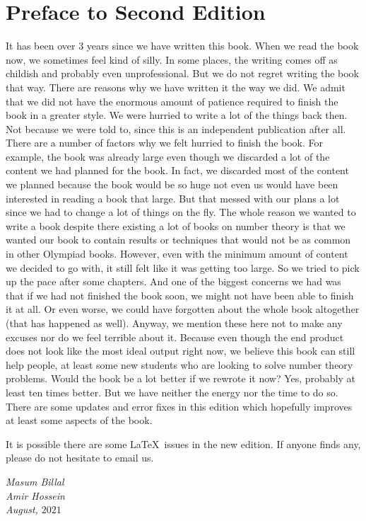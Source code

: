 \documentclass[leqno,11pt]{book}
\begin{document}
\section*{Preface to Second Edition}
It has been over $3$ years since we have written this book. When we read the book now, we sometimes feel kind of silly. In some places, the writing comes off as childish and probably even unprofessional. But we do not regret writing the book that way. There are reasons why we have written it the way we did. We admit that we did not have the enormous amount of patience required to finish the book in a greater style. We were hurried to write a lot of the things back then. Not because we were told to, since this is an independent publication after all. There are a number of factors why we felt hurried to finish the book. For example, the book was already large even though we discarded a lot of the content we had planned for the book. In fact, we discarded most of the content we planned because the book would be so huge not even us would have been interested in reading a book that large. But that messed with our plans a lot since we had to change a lot of things on the fly. The whole reason we wanted to write a book despite there existing a lot of books on number theory is that we wanted our book to contain results or techniques that would not be as common in other Olympiad books. However, even with the minimum amount of content we decided to go with, it still felt like it was getting too large. So we tried to pick up the pace after some chapters. And one of the biggest concerns we had was that if we had not finished the book soon, we might not have been able to finish it at all. Or even worse, we could have forgotten about the whole book altogether (that has happened as well). Anyway, we mention these here not to make any excuses nor do we feel terrible about it. Because even though the end product does not look like the most ideal output right now, we believe this book can still help people, at least some new students who are looking to solve number theory problems. Would the book be a lot better if we rewrote it now? Yes, probably at least ten times better. But we have neither the energy nor the time to do so. There are some updates and error fixes in this edition which hopefully improves at least some aspects of the book.

It is possible there are some \LaTeX\ issues in the new edition. If anyone finds any, please do not hesitate to email us.

\begin{flushright}
	\it Masum Billal\\
	Amir Hossein\\
	August, $2021$
\end{flushright}
\end{document}
